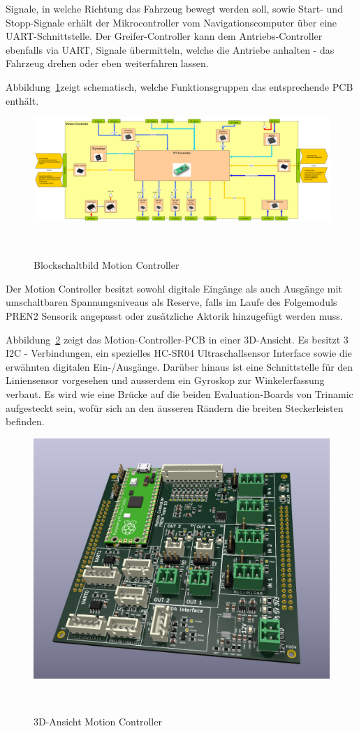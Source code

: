 \documentclass[main.tex]{subfiles} %
\begin{document}
Signale, in welche Richtung das Fahrzeug bewegt werden soll, sowie Start- und
Stopp-Signale erhält der Mikrocontroller vom Navigationscomputer über eine
UART-Schnittstelle. Der Greifer-Controller kann dem Antriebs-Controller
ebenfalls via UART, Signale übermitteln, welche die Antriebe anhalten - das
Fahrzeug drehen oder eben weiterfahren lassen.

Abbildung~\ref{fig:Blockschaltbild_Motioncontroller}zeigt schematisch, welche
Funktionsgruppen das entsprechende PCB enthält.

\begin{figure}[H]
    \centering
    \includegraphics[width = 1\linewidth]{fig_Antriebe_und_Dimensionierung/MotionController_Blockschaltbild.pdf}
    \caption{Blockschaltbild Motion Controller}~\label{fig:Blockschaltbild_Motioncontroller}
\end{figure}

Der Motion Controller besitzt sowohl digitale Eingänge als auch Ausgänge mit
umschaltbaren Spannungsniveaus als Reserve, falls im Laufe des Folgemoduls
PREN2 Sensorik angepasst oder zusätzliche Aktorik hinzugefügt werden muss.

Abbildung~\ref{fig:MotionBoard_PCB} zeigt das Motion-Controller-PCB in einer
3D-Ansicht. Es besitzt 3 I2C - Verbindungen, ein spezielles HC-SR04
Ultraschallsensor Interface sowie die erwähnten digitalen Ein-/Ausgänge.
Darüber hinaus ist eine Schnittstelle für den Liniensensor vorgesehen und
ausserdem ein Gyroskop zur Winkelerfassung verbaut. Es wird wie eine Brücke auf
die beiden Evaluation-Boards von Trinamic aufgesteckt sein, wofür sich an den
äusseren Rändern die breiten Steckerleisten befinden.

\begin{figure}[H]
    \centering
    \includegraphics[width = 0.75\linewidth]{fig_Antriebe_und_Dimensionierung/MotionControllerPCB.jpg}
    \caption{3D-Ansicht Motion Controller}~\label{fig:MotionBoard_PCB}
\end{figure}
\end{document}
